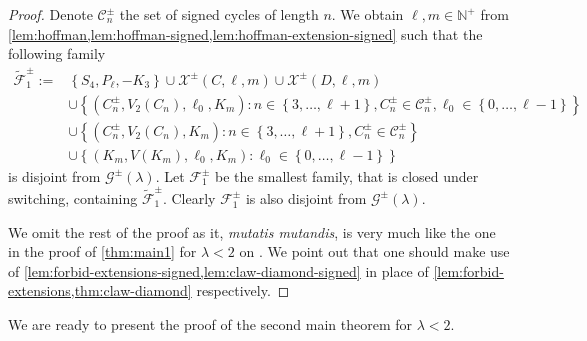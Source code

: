 \documentclass[11pt]{article}
\theoremstyle{definition}
\theoremstyle{remark}
\newcommand{\dset}[2]{\left\{{#1}\colon{#2}\right\}}
\newcommand{\sset}[1]{\left\{{#1}\right\}}
\newcommand{\la}{\lambda}
\newcommand{\F}{\mathcal{F}}
\newcommand{\G}{\mathcal{G}}
\newcommand{\N}{\mathbb{N}}
\newcommand{\X}{\mathcal{X}}
\newcommand{\Gs}{\G^\pm(\la)}
\begin{document}
\begin{proof}
    Denote $\mathcal{C}^\pm_n$ the set of signed cycles of length $n$. We obtain $\ell, m \in \N^+$ from \cref{lem:hoffman,lem:hoffman-signed,lem:hoffman-extension-signed} such that the following family
    \begin{align*}
        \widetilde{\F}_1^\pm := & \sset{S_4, P_\ell, -K_3} \cup \X^\pm(C, \ell, m) \cup \X^\pm(D, \ell, m) \\
        & \cup \dset{(C_n^\pm, V_2(C_n), \ell_0, K_m)}{n \in \sset{3, \dots, \ell + 1}, C_n^\pm \in \mathcal{C}_n^\pm, \ell_0 \in \sset{0, \dots, \ell - 1}} \\
        & \cup \dset{(C_n^\pm, V_2(C_n), K_m)}{n \in \sset{3, \dots, \ell + 1}, C_n^\pm \in \mathcal{C}_n^\pm} \\
        & \cup \dset{(K_m, V(K_m), \ell_0, K_m)}{\ell_0 \in \sset{0, \dots, \ell-1}}
    \end{align*}
    is disjoint from $\Gs$. Let $\F_1^\pm$ be the smallest family, that is closed under switching, containing $\widetilde{\F}_1^\pm$. Clearly $\F_1^\pm$ is also disjoint from $\Gs$.
    
    We omit the rest of the proof as it, \emph{mutatis mutandis}, is very much like the one in the proof of \cref{thm:main1} for $\la < 2$ on . We point out that one should make use of \cref{lem:forbid-extensions-signed,lem:claw-diamond-signed} in place of \cref{lem:forbid-extensions,thm:claw-diamond} respectively.
\end{proof}

We are ready to present the proof of the second main theorem for $\la < 2$.
\end{document}
